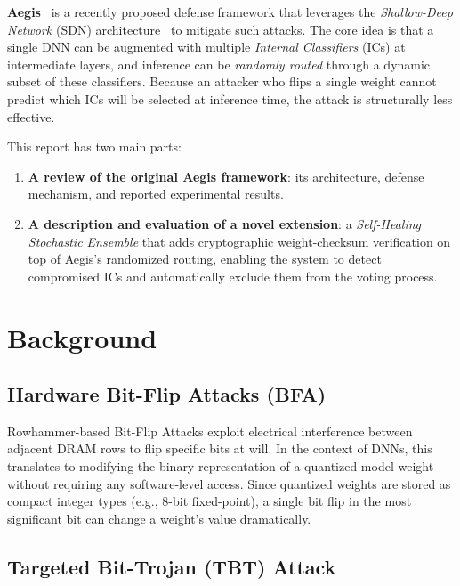 \documentclass[12pt,a4paper]{article}
\newcommand{\sdn}{\textsc{SDN}}
\newcommand{\ic}{\textsc{IC}}
\begin{document}
\textbf{Aegis}~\cite{aegis} is a recently proposed defense framework that leverages the \textit{Shallow-Deep Network} (\sdn{}) architecture~\cite{sdn} to mitigate such attacks. The core idea is that a single DNN can be augmented with multiple \textit{Internal Classifiers} (\ic{}s) at intermediate layers, and inference can be \emph{randomly routed} through a dynamic subset of these classifiers. Because an attacker who flips a single weight cannot predict which \ic{}s will be selected at inference time, the attack is structurally less effective.

This report has two main parts:
\begin{enumerate}
    \item \textbf{A review of the original Aegis framework}: its architecture, defense mechanism, and reported experimental results.
    \item \textbf{A description and evaluation of a novel extension}: a \textit{Self-Healing Stochastic Ensemble} that adds cryptographic weight-checksum verification on top of Aegis's randomized routing, enabling the system to detect compromised \ic{}s and automatically exclude them from the voting process.
\end{enumerate}

\section{Background}
\label{sec:background}

\subsection{Hardware Bit-Flip Attacks (BFA)}

Rowhammer-based Bit-Flip Attacks exploit electrical interference between adjacent DRAM rows to flip specific bits at will. In the context of DNNs, this translates to modifying the binary representation of a quantized model weight without requiring any software-level access. Since quantized weights are stored as compact integer types (e.g., 8-bit fixed-point), a single bit flip in the most significant bit can change a weight's value dramatically.

\subsection{Targeted Bit-Trojan (TBT) Attack}
\end{document}
